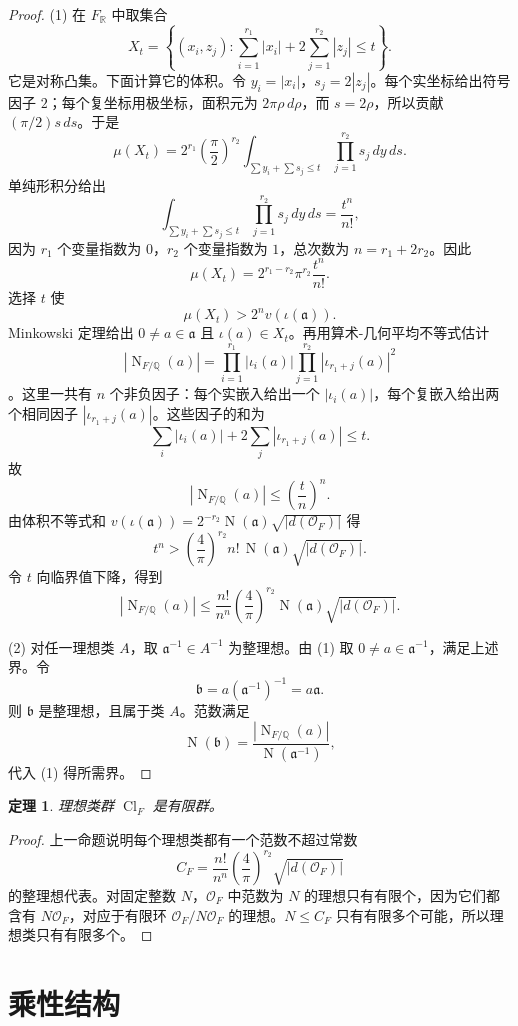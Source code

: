 \documentclass[11pt,a4paper,openany]{ctexbook}
\numberwithin{equation}{chapter}
\newcommand{\Q}{\mathbb{Q}}
\newcommand{\R}{\mathbb{R}}
\newcommand{\OF}{\mathcal{O}_F}
\newcommand{\Nm}{\operatorname{N}}
\newcommand{\Cl}{\operatorname{Cl}}
\theoremstyle{plain}
\newtheorem{theorem}{定理}[chapter]
\theoremstyle{definition}
\theoremstyle{remark}
\begin{document}
\begin{proof}
(1) 在 $F_\R$ 中取集合
\[
X_t=\left\{(x_i,z_j):\sum_{i=1}^{r_1}|x_i|
 +2\sum_{j=1}^{r_2}|z_j|\le t\right\}.
\]
它是对称凸集。下面计算它的体积。令 $y_i=|x_i|$，$s_j=2|z_j|$。每个实坐标给出符号因子 $2$；每个复坐标用极坐标，面积元为
$2\pi\rho\,d\rho$，而 $s=2\rho$，所以贡献
$(\pi/2)s\,ds$。于是
\[
\mu(X_t)
=2^{r_1}\left(\frac{\pi}{2}\right)^{r_2}
\int_{\sum y_i+\sum s_j\le t}\prod_{j=1}^{r_2}s_j\,dy\,ds.
\]
单纯形积分给出
\[
\int_{\sum y_i+\sum s_j\le t}\prod_{j=1}^{r_2}s_j\,dy\,ds
=\frac{t^n}{n!},
\]
因为 $r_1$ 个变量指数为 $0$，$r_2$ 个变量指数为 $1$，总次数为
$n=r_1+2r_2$。因此
\[
\mu(X_t)=2^{r_1-r_2}\pi^{r_2}\frac{t^n}{n!}.
\]
选择 $t$ 使
\[
\mu(X_t)>2^n v(\iota(\mathfrak a)).
\]
Minkowski 定理给出 $0\ne a\in\mathfrak a$ 且 $\iota(a)\in X_t$。再用算术-几何平均不等式估计
\[
|\Nm_{F/\Q}(a)|
=\prod_{i=1}^{r_1}|\iota_i(a)|
\prod_{j=1}^{r_2}|\iota_{r_1+j}(a)|^2
\]
。这里一共有 $n$ 个非负因子：每个实嵌入给出一个
$|\iota_i(a)|$，每个复嵌入给出两个相同因子
$|\iota_{r_1+j}(a)|$。这些因子的和为
\[
\sum_i|\iota_i(a)|+2\sum_j|\iota_{r_1+j}(a)|\le t.
\]
故
\[
|\Nm_{F/\Q}(a)|\le\left(\frac tn\right)^n.
\]
由体积不等式和
$v(\iota(\mathfrak a))=2^{-r_2}\Nm(\mathfrak a)\sqrt{|d(\OF)|}$ 得
\[
t^n>
\left(\frac4\pi\right)^{r_2}n!\,\Nm(\mathfrak a)\sqrt{|d(\OF)|}.
\]
令 $t$ 向临界值下降，得到
\[
|\Nm_{F/\Q}(a)|
\le
\frac{n!}{n^n}\left(\frac4\pi\right)^{r_2}
\Nm(\mathfrak a)\sqrt{|d(\OF)|}.
\]

(2) 对任一理想类 $A$，取 $\mathfrak a^{-1}\in A^{-1}$ 为整理想。由 (1) 取
$0\ne a\in\mathfrak a^{-1}$，满足上述界。令
\[
\mathfrak b=a(\mathfrak a^{-1})^{-1}=a\mathfrak a.
\]
则 $\mathfrak b$ 是整理想，且属于类 $A$。范数满足
\[
\Nm(\mathfrak b)=\frac{|\Nm_{F/\Q}(a)|}{\Nm(\mathfrak a^{-1})},
\]
代入 (1) 得所需界。
\end{proof}

\begin{theorem}
理想类群 $\Cl_F$ 是有限群。
\end{theorem}

\begin{proof}
上一命题说明每个理想类都有一个范数不超过常数
\[
C_F=\frac{n!}{n^n}\left(\frac4\pi\right)^{r_2}\sqrt{|d(\OF)|}
\]
的整理想代表。对固定整数 $N$，$\OF$ 中范数为 $N$ 的理想只有有限个，因为它们都含有 $N\OF$，对应于有限环 $\OF/N\OF$ 的理想。$N\le C_F$ 只有有限多个可能，所以理想类只有有限多个。
\end{proof}

\section{乘性结构}
\end{document}
